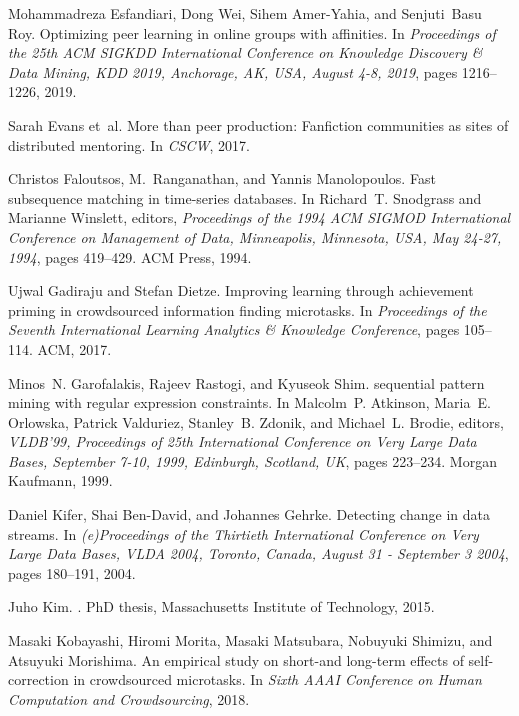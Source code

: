 \documentclass[11pt]{article}
\begin{document}
\begin{thebibliography}{10}
\begin{small}
Mohammadreza Esfandiari, Dong Wei, Sihem Amer{-}Yahia, and Senjuti~Basu Roy.
\newblock Optimizing peer learning in online groups with affinities.
\newblock In {\em Proceedings of the 25th {ACM} {SIGKDD} International
  Conference on Knowledge Discovery {\&} Data Mining, {KDD} 2019, Anchorage,
  AK, USA, August 4-8, 2019}, pages 1216--1226, 2019.

Sarah Evans et~al.
\newblock More than peer production: Fanfiction communities as sites of
  distributed mentoring.
\newblock In {\em CSCW}, 2017.

Christos Faloutsos, M.~Ranganathan, and Yannis Manolopoulos.
\newblock Fast subsequence matching in time-series databases.
\newblock In Richard~T. Snodgrass and Marianne Winslett, editors, {\em
  Proceedings of the 1994 {ACM} {SIGMOD} International Conference on Management
  of Data, Minneapolis, Minnesota, USA, May 24-27, 1994}, pages 419--429. {ACM}
  Press, 1994.

Ujwal Gadiraju and Stefan Dietze.
\newblock Improving learning through achievement priming in crowdsourced
  information finding microtasks.
\newblock In {\em Proceedings of the Seventh International Learning Analytics
  \& Knowledge Conference}, pages 105--114. ACM, 2017.

Minos~N. Garofalakis, Rajeev Rastogi, and Kyuseok Shim.
 sequential pattern mining with regular expression
  constraints.
\newblock In Malcolm~P. Atkinson, Maria~E. Orlowska, Patrick Valduriez,
  Stanley~B. Zdonik, and Michael~L. Brodie, editors, {\em VLDB'99, Proceedings
  of 25th International Conference on Very Large Data Bases, September 7-10,
  1999, Edinburgh, Scotland, {UK}}, pages 223--234. Morgan Kaufmann, 1999.

Daniel Kifer, Shai Ben{-}David, and Johannes Gehrke.
\newblock Detecting change in data streams.
\newblock In {\em (e)Proceedings of the Thirtieth International Conference on
  Very Large Data Bases, {VLDA} 2004, Toronto, Canada, August 31 - September 3
  2004}, pages 180--191, 2004.

Juho Kim.
.
\newblock PhD thesis, Massachusetts Institute of Technology, 2015.

Masaki Kobayashi, Hiromi Morita, Masaki Matsubara, Nobuyuki Shimizu, and
  Atsuyuki Morishima.
\newblock An empirical study on short-and long-term effects of self-correction
  in crowdsourced microtasks.
\newblock In {\em Sixth AAAI Conference on Human Computation and
  Crowdsourcing}, 2018.


\end{small}
\end{thebibliography}
\end{document}
